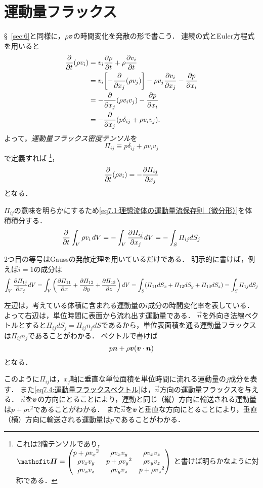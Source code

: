 \section{運動量フラックス}
\S~\ref{sec:6}と同様に，$\rho\vb*{v}$の時間変化を発散の形で書こう．
連続の式とEuler方程式を用いると
\begin{align*}
	\pdv{t}(\rho v_i) &= v_i \pdv{\rho}{t} + \rho \pdv{v_i}{t} \\
	&= v_i \bqty{ -\pdv{x_j}(\rho v_j) } - \rho v_j \pdv{v_i}{x_j} - \pdv{p}{x_i} \\
	&= - \pdv{x_j}(\rho v_iv_j) - \pdv{p}{x_i} \\
	&= - \pdv{x_j}( p\delta_{ij} + \rho v_iv_j ).
\end{align*}
よって，\emph{運動量フラックス密度テンソル}を
\setcounter{equation}{1}
\begin{equation}
	\varPi_{ij} \equiv p\delta_{ij} + \rho v_iv_j
\end{equation}
で定義すれば
\footnote{
これは2階テンソルであり，
$
\displaystyle	
\mat{\varPi} =
\begin{pmatrix}
	p + \rho {v_x}^2 & \rho v_xv_y & \rho v_xv_z \\
	\rho v_xv_y & p + \rho {v_y}^2 & \rho v_yv_z \\
	\rho v_xv_z & \rho v_yv_z & p + \rho {v_z}^2 \\
\end{pmatrix}
$
と書けば明らかなように対称である．
}，
\setcounter{equation}{0}
\begin{equation}\label{eq7.1:理想流体の運動量流保存則（微分形）}
	\pdv{t}(\rho v_i) = -\pdv{\varPi_{ij}}{x_j}
\end{equation}
となる．

$\varPi_{ij}$の意味を明らかにするため\eqref{eq7.1:理想流体の運動量流保存則（微分形）}を体積積分する．
\setcounter{equation}{2}
\begin{equation}
	\pdv{t} \int_V \rho v_i \, dV = - \int_V \pdv{\varPi_{ij}}{x_j} dV = - \int_S \varPi_{ij} dS_j
\end{equation}
\begin{details}
2つ目の等号はGaussの発散定理を用いているだけである．
明示的に書けば，例えば$i=1$の成分は
\[
	\int_V \pdv{\varPi_{1j}}{x_j} dV = \int_V \pqty{ \pdv{\varPi_{11}}{x} + \pdv{\varPi_{12}}{y} + \pdv{\varPi_{13}}{z} } \dV
	= \int_S ( \varPi_{11} dS_x + \varPi_{12} dS_y + \varPi_{13} dS_z ) = \int_S \varPi_{1j} dS_j
\]
\end{details}
左辺は，考えている体積に含まれる運動量の$i$成分の時間変化率を表している．
よって右辺は，単位時間に表面から流れ出す運動量である．
$\vec{n}$を外向き法線ベクトルとすると$\varPi_{ij} dS_j = \varPi_{ij} n_j dS$であるから，単位表面積を通る運動量フラックスは$\varPi_{ij} n_j$であることがわかる．
ベクトルで書けば
\begin{equation}\label{eq7.4:運動量フラックスベクトル}
	p \vb*{n} + \rho\vb*{v} (\vb*{v}\cdot\vb*{n})
\end{equation}
となる．

このように$\varPi_{ij}$は，$x_j$軸に垂直な単位面積を単位時間に流れる運動量の$j$成分を表す．
また\eqref{eq7.4:運動量フラックスベクトル}は，$\vec{n}$方向の運動量フラックスを与える．
$\vec{n}$を$\vb*{v}$の方向にとることにより，運動と同じ（縦）方向に輸送される運動量は$p+\rho v^2$であることがわかる．
また$\vec{n}$を$\vb*{v}$と垂直な方向にとることにより，垂直（横）方向に輸送される運動量は$p$であることがわかる．





\BackToTheToc